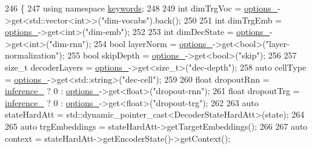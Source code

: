 \begin{DoxyCode}
246                                                           \{
247     \textcolor{keyword}{using namespace }\hyperlink{namespacekeywords}{keywords};
248 
249     \textcolor{keywordtype}{int} dimTrgVoc = \hyperlink{classmarian_1_1DecoderBase_a75375e7661a014fd15bbee3b0a047b91}{options\_}->get<std::vector<int>>(\textcolor{stringliteral}{"dim-vocabs"}).back();
250 
251     \textcolor{keywordtype}{int} dimTrgEmb = \hyperlink{classmarian_1_1DecoderBase_a75375e7661a014fd15bbee3b0a047b91}{options\_}->get<\textcolor{keywordtype}{int}>(\textcolor{stringliteral}{"dim-emb"});
252 
253     \textcolor{keywordtype}{int} dimDecState = \hyperlink{classmarian_1_1DecoderBase_a75375e7661a014fd15bbee3b0a047b91}{options\_}->get<\textcolor{keywordtype}{int}>(\textcolor{stringliteral}{"dim-rnn"});
254     \textcolor{keywordtype}{bool} layerNorm = \hyperlink{classmarian_1_1DecoderBase_a75375e7661a014fd15bbee3b0a047b91}{options\_}->get<\textcolor{keywordtype}{bool}>(\textcolor{stringliteral}{"layer-normalization"});
255     \textcolor{keywordtype}{bool} skipDepth = \hyperlink{classmarian_1_1DecoderBase_a75375e7661a014fd15bbee3b0a047b91}{options\_}->get<\textcolor{keywordtype}{bool}>(\textcolor{stringliteral}{"skip"});
256 
257     \textcolor{keywordtype}{size\_t} decoderLayers = \hyperlink{classmarian_1_1DecoderBase_a75375e7661a014fd15bbee3b0a047b91}{options\_}->get<\textcolor{keywordtype}{size\_t}>(\textcolor{stringliteral}{"dec-depth"});
258     \textcolor{keyword}{auto} cellType = \hyperlink{classmarian_1_1DecoderBase_a75375e7661a014fd15bbee3b0a047b91}{options\_}->get<std::string>(\textcolor{stringliteral}{"dec-cell"});
259 
260     \textcolor{keywordtype}{float} dropoutRnn = \hyperlink{classmarian_1_1DecoderBase_a808975d515f60a53096f6794c3dc61d4}{inference\_} ? 0 : \hyperlink{classmarian_1_1DecoderBase_a75375e7661a014fd15bbee3b0a047b91}{options\_}->get<\textcolor{keywordtype}{float}>(\textcolor{stringliteral}{"dropout-rnn"});
261     \textcolor{keywordtype}{float} dropoutTrg = \hyperlink{classmarian_1_1DecoderBase_a808975d515f60a53096f6794c3dc61d4}{inference\_} ? 0 : \hyperlink{classmarian_1_1DecoderBase_a75375e7661a014fd15bbee3b0a047b91}{options\_}->get<\textcolor{keywordtype}{float}>(\textcolor{stringliteral}{"dropout-trg"});
262 
263     \textcolor{keyword}{auto} stateHardAtt = std::dynamic\_pointer\_cast<DecoderStateHardAtt>(state);
264 
265     \textcolor{keyword}{auto} trgEmbeddings = stateHardAtt->getTargetEmbeddings();
266 
267     \textcolor{keyword}{auto} context = stateHardAtt->getEncoderState()->getContext();

\end{DoxyCode}
